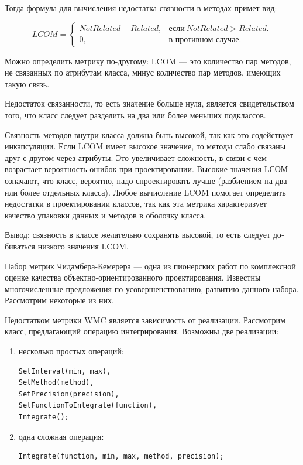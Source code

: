 \documentclass{../../text-style}
\begin{document}
Тогда  формула для вычисления недостатка связности в методах примет вид:

\begin{equation}
    LCOM=\begin{cases}
        NotRelated - Related, & \text{если}\ NotRelated > Related.\\
        0,                    & \text{в противном случае}.
    \end{cases}
\end{equation}

Можно определить метрику по-другому: LCOM --- это количество пар методов, не связанных по атрибутам класса, минус количество пар методов, имеющих такую связь.

Недостаток связанности, то есть значение больше нуля, является свидетельством того, что класс следует разделить на два или более меньших подклассов.

Связность методов внутри класса должна быть высокой, так как это содействует инкапсуляции. Если LCOM имеет высокое значение, то методы слабо связаны друг с другом через атрибуты. Это увеличивает сложность, в связи с чем возрастает вероятность ошибок при проектировании. Высокие значения LСОМ означают, что класс, вероятно, надо спроектировать лучше (разбиением на два или более отдельных класса). Любое вычисление LCOM помогает определить недостатки в проектировании классов, так как эта метрика характеризует качество упаковки данных и методов в оболочку класса.

Вывод: связность в классе желательно сохранять высокой, то есть следует до­биваться низкого значения LCOM. 

Набор метрик Чидамбера-Кемерера --- одна из пионерских работ по комплексной оценке качества объектно-ориентированного проектирования. Известны многочисленные предложения по усовершенствованию, развитию данного набора. Рассмотрим некоторые из них.

Недостатком метрики WMC является зависимость от реализации. Рассмотрим класс, предлагающий операцию интегрирования. Возможны две реализации:

\begin{enumerate}
    \item несколько простых операций:
    \begin{verbatim}
SetInterval(min, max),
SetMethod(method),
SetPrecision(precision),
SetFunctionToIntegrate(function),
Integrate();
    \end{verbatim}
    \item одна сложная операция:
    \begin{verbatim}
Integrate(function, min, max, method, precision);
    \end{verbatim}
\end{enumerate}
\end{document}
